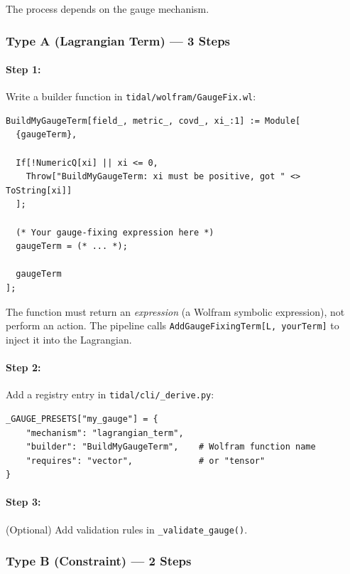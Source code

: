 The process depends on the gauge mechanism.

\subsubsection{Type A (Lagrangian Term) --- 3 Steps}
\label{sec:gauge-dev-type-a}

\paragraph{Step 1:} Write a builder function in \texttt{tidal/wolfram/GaugeFix.wl}:

\begin{lstlisting}[style=mathematica]
BuildMyGaugeTerm[field_, metric_, covd_, xi_:1] := Module[
  {gaugeTerm},

  If[!NumericQ[xi] || xi <= 0,
    Throw["BuildMyGaugeTerm: xi must be positive, got " <> ToString[xi]]
  ];

  (* Your gauge-fixing expression here *)
  gaugeTerm = (* ... *);

  gaugeTerm
];
\end{lstlisting}

The function must return an \emph{expression} (a Wolfram symbolic expression),
not perform an action. The pipeline calls \texttt{AddGaugeFixingTerm[L, yourTerm]}
to inject it into the Lagrangian.

\paragraph{Step 2:} Add a registry entry in \texttt{tidal/cli/\_derive.py}:

\begin{lstlisting}[style=python]
_GAUGE_PRESETS["my_gauge"] = {
    "mechanism": "lagrangian_term",
    "builder": "BuildMyGaugeTerm",    # Wolfram function name
    "requires": "vector",             # or "tensor"
}
\end{lstlisting}

\paragraph{Step 3:} (Optional) Add validation rules in \texttt{\_validate\_gauge()}.

\subsubsection{Type B (Constraint) --- 2 Steps}
\label{sec:gauge-dev-type-b}

